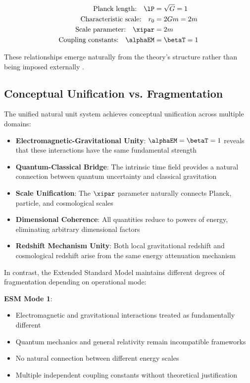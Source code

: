 	\begin{align}
		\text{Planck length:} \quad \lP &= \sqrt{G} = 1 \nonumber\\
		\text{Characteristic scale:} \quad r_0 &= 2Gm = 2m \nonumber\\
		\text{Scale parameter:} \quad \xipar &= 2m \nonumber\\
		\text{Coupling constants:} \quad \alphaEM &= \betaT = 1 \nonumber
	\end{align}
	
	These relationships emerge naturally from the theory's structure rather than being imposed externally \cite{pascher_beta_derivation_2025}.
	
	\subsection{Conceptual Unification vs. Fragmentation}
	\label{subsec:unification_fragmentation}
	
	The unified natural unit system achieves conceptual unification across multiple domains:
	
	\begin{itemize}
		\item \textbf{Electromagnetic-Gravitational Unity}: $\alphaEM = \betaT = 1$ reveals that these interactions have the same fundamental strength
		\item \textbf{Quantum-Classical Bridge}: The intrinsic time field provides a natural connection between quantum uncertainty and classical gravitation
		\item \textbf{Scale Unification}: The $\xipar$ parameter naturally connects Planck, particle, and cosmological scales
		\item \textbf{Dimensional Coherence}: All quantities reduce to powers of energy, eliminating arbitrary dimensional factors
		\item \textbf{Redshift Mechanism Unity}: Both local gravitational redshift and cosmological redshift arise from the same energy attenuation mechanism \cite{Pound1960}
	\end{itemize}
	
	In contrast, the Extended Standard Model maintains different degrees of fragmentation depending on operational mode:
	
	\textbf{ESM Mode 1}:
	\begin{itemize}
		\item Electromagnetic and gravitational interactions treated as fundamentally different
		\item Quantum mechanics and general relativity remain incompatible frameworks
		\item No natural connection between different energy scales
		\item Multiple independent coupling constants without theoretical justification
	\end{itemize}
	
